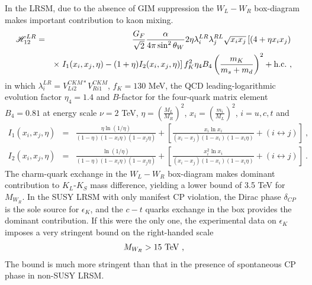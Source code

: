 \documentclass[prd,aps,preprint,tightenlines,superscriptaddress]{revtex4}
\begin{document}
In the LRSM, due to the absence of GIM
suppression the $W_L-W_R$ box-diagram makes important contribution to kaon mixing.
\begin{eqnarray}\label{c1}
\mathscr{H}^{LR}_{12}&=&\frac{G_F}{\sqrt{2}}\frac{\alpha}{4\pi\sin^2\theta_W}2\eta\lambda^{LR}_i\lambda^{RL}_j\sqrt{x_ix_j}\left[(4+\eta
x_ix_j) \right. \nonumber\\
& &\times \left. I_1(x_i,x_j,\eta) - (1+\eta)I_2(x_i,x_j,\eta)\right] f^2_K \eta_4 B_4 \left( \frac{m_K}{m_s+m_d} \right)^2  + {\rm h.c.} \ ,
\end{eqnarray}
in which $\lambda^{LR}_{i}=V^{CKM *}_{Li2}V^{CKM}_{Ri1}$,
$f_K=130$ MeV, the QCD leading-logarithmic evolution factor $\eta_4 = 1.4$ and
$B$-factor for the four-quark matrix element $B_4 =0.81$ at energy scale $\nu = 2$ TeV,
$\displaystyle\eta=\left(\frac{M_L}{M_R}\right)^2$,
$\displaystyle x_i=\left(\frac{m_i}{M_L}\right)^2$, $i=u,c,t$ and
\begin{eqnarray}\label{c2}
I_1(x_i,x_j,\eta)&=&\frac{\eta\ln(1/\eta)}{(1-\eta)(1-x_i\eta)(1-x_j\eta)} + \left[\frac{x_i\ln
x_i}{(x_i-x_j)(1-x_i)(1-x_i\eta)}+(i\leftrightarrow j)\right] \ ,
\nonumber\\
I_2(x_i,x_j,\eta)&=&\frac{\ln(1/\eta)}{(1-\eta)(1-x_i\eta)(1-x_j\eta)}+ \left[\frac{x_i^2\ln
x_i}{(x_i-x_j)(1-x_i)(1-x_i\eta)}+(i\leftrightarrow j)\right] \ .
\end{eqnarray}
The charm-quark exchange in the $W_L-W_R$ box-diagram makes dominant contribution to $K_L$-$K_S$ mass difference, yielding a lower bound of 3.5 TeV for $M_{W_R}$. In the SUSY LRSM with only manifest CP violation, the Dirac phase $\delta_{CP}$ is the sole source for $\epsilon_{K}$, and the $c-t$ quarks exchange in the box provides the
dominant contribution. If this were the only one, the experimental data on $\epsilon_K$ imposes a very stringent bound on the right-handed scale
\begin{eqnarray}
M_{W_R} > 15\ {\rm TeV} \ ,
\end{eqnarray}
The bound is much more stringent than that in the presence of spontaneous CP phase in non-SUSY LRSM. 
\end{document}
